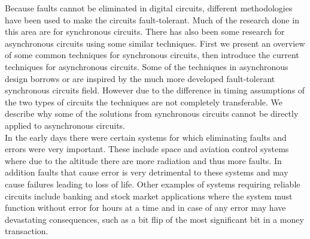 \documentclass[12pt]{report}
\begin{document}
Because faults cannot be eliminated in digital circuits, different methodologies have been used to make the circuits fault-tolerant.  Much of the research done in this area are for synchronous circuits.  There has also been some research for asynchronous circuits using some similar techniques. First we present an overview of some common techniques for synchronous circuits, then introduce the current techniques for asynchronous circuits.  Some of the techniques in asynchronous design borrows or are inspired by the much more developed fault-tolerant synchronous circuits field.  However due to the difference in timing assumptions of the two types of circuits the techniques are not completely transferable.  We describe why some of the solutions from synchronous circuits cannot be directly applied to asynchronous circuits.\\

In the early days there were certain systems for which eliminating faults and errors were very important.  These include space and aviation control systems where due to the altitude there are more radiation and thus more faults.  In addition faults that cause error is very detrimental to these systems and may cause failures leading to loss of life.  Other examples of systems requiring reliable circuits include banking and stock market applications where the system must function without error for hours at a time and in case of any error may have devastating consequences, such as a bit flip of the most significant bit in a money transaction. \\
\end{document}
